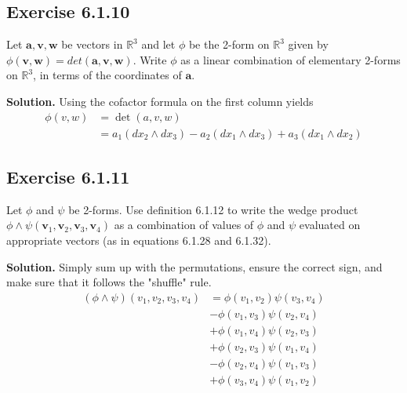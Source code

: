 \documentclass[12pt]{article}
\newcommand{\vt}[1]{\textbf{#1}}
\begin{document}
\newpage








\subsection*{Exercise 6.1.10}
Let $\vt a, \vt v, \vt w$ be vectors in $\mathbb R^3$ and let $\phi$ be the 2-form on $\mathbb R^3$ given by $\phi(\vt v,\vt w) = det(\vt a,\vt v,\vt w)$. Write $\phi$ as a linear combination of elementary 2-forms on $\mathbb R^3$, in terms of the coordinates of $\vt a$.

\medskip

\textbf{Solution.}
Using the cofactor formula on the first column yields 
\begin{align*}
  \phi(v, w)
  &= \det(a,v,w) \\
  &= a_1(dx_2\wedge dx_3)- a_2 (dx_1\wedge dx_3)+ a_3(dx_1\wedge dx_2)
\end{align*}
\newpage








\subsection*{Exercise 6.1.11}
Let $\phi$ and $\psi$ be 2-forms. Use definition 6.1.12 to write the wedge product $\phi\wedge\psi(\vt v_1,\vt v_2,\vt v_3,\vt v_4)$ as a combination of values of $\phi$ and $\psi$ evaluated on appropriate vectors (as in equations 6.1.28 and 6.1.32).

\medskip

\textbf{Solution.}
Simply sum up with the permutations, ensure the correct sign, 
and make sure that it follows the "shuffle" rule.
\begin{align*}
  (\phi \wedge \psi)(v_1, v_2, v_3, v_4) 
  &= \phi(v_1, v_2)\psi(v_3, v_4) \\
  &- \phi(v_1, v_3)\psi(v_2, v_4) \\
  &+ \phi(v_1, v_4)\psi(v_2, v_3) \\
  &+ \phi(v_2, v_3)\psi(v_1, v_4) \\
  &- \phi(v_2, v_4)\psi(v_1, v_3) \\
  &+ \phi(v_3, v_4)\psi(v_1, v_2) 
\end{align*}
\newpage
\end{document}
